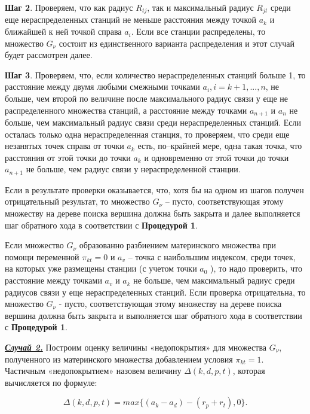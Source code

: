\textbf{Шаг 2}. Проверяем, что как радиус $R_{tj}$, так и максимальный радиус $R_{jt}$ среди еще нераспределенных станций не меньше расстояния между точкой $a_k$ и ближайшей к ней точкой справа $a_i$.  Если все станции распределены, то множество $G_\nu$ состоит из единственного варианта распределения и этот случай будет рассмотрен далее.

\textbf{Шаг 3}. Проверяем, что, если количество нераспределенных станций больше 1, то расстояние между двумя любыми смежными точками $a_i, i=k+1,...,n$, не больше, чем второй по величине после максимального радиус связи у еще не распределенного множества станций, а расстояние между точками $a_{n+1}$ и $a_n$  не больше, чем максимальный радиус связи среди нераспределенных станций. Если осталась только одна нераспределенная станция, то проверяем, что среди еще незанятых точек справа от точки $a_k$  есть, по–крайней мере, одна такая точка, что расстояния от этой точки до точки $a_k$ и одновременно от этой точки до точки $a_{n+1}$ не больше, чем  радиус связи у нераспределенной станции.

Если в результате проверки оказывается, что, хотя бы на одном из шагов получен отрицательный результат, то множество $G_\nu$ -- пусто, соответствующая этому множеству на дереве поиска вершина должна быть закрыта и далее выполняется шаг обратного хода в соответствии с \textbf{Процедурой 1}.

Если множество $G_\nu$ образованно разбиением материнского множества при помощи переменной $\pi_{kt}=0$ и $a_v$ -- точка с наибольшим индексом, среди точек, на которых уже размещены станции (с учетом точки $a_0$ ), то надо проверить, что расстояние между точками $a_v$ и $a_k$ не больше, чем максимальный радиус среди радиусов связи у еще нераспределенных станций. Если проверка отрицательна, то множество $G_\nu$  - пусто, соответствующая этому множеству на дереве поиска вершина должна быть закрыта и выполняется шаг обратного хода в соответствии с \textbf{Процедурой 1}.


\underline{\textit{\textbf{Случай 2.}}}
Построим оценку величины «недопокрытия» для множества $G_\nu$, полученного из материнского множества добавлением условия $\pi_{kt}=1$. Частичным «недопокрытием» назовем величину $\Delta(k,d,p,t)$, которая вычисляется по формуле:

\begin{equation}\label{eq:part4_delta}
\Delta(k,d,p,t) = max\{\left(a_{k} - a_{d} \right) - \left(r_{p} + r_{t} \right), 0\}.
\end{equation}


